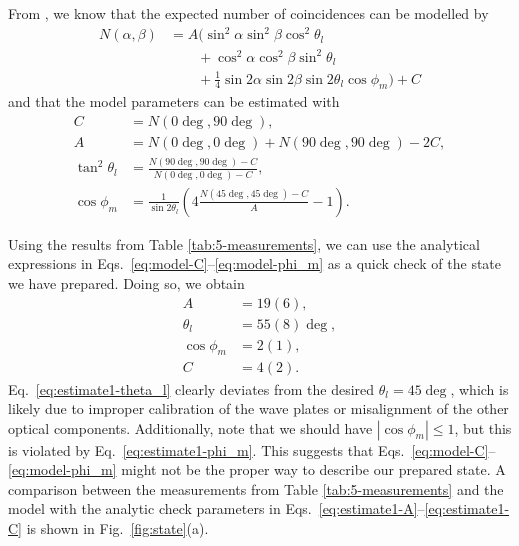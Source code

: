 \documentclass{../paper}
\newcommand{\eq}[1]{Eq.~\eqref{#1}}
\newcommand{\eqs}[2]{Eqs.~\eqref{#1}--\eqref{#2}}
\newcommand{\fig}[1]{Fig.~\ref{#1}}
\begin{document}
From \cite{LabManual}, we know that the expected number of coincidences can be modelled by
\begin{equation}\label{eq:N-model}
  \begin{aligned}
    N(\alpha,\beta)
    &= A (\sin^2\alpha \sin^2\beta \cos^2\theta_l \\
    &\qquad + \cos^2\alpha \cos^2\beta \sin^2\theta_l \\
    &\qquad + \frac{1}{4} \sin2\alpha \sin2\beta \sin2\theta_l \cos\phi_m) + C
  \end{aligned}
\end{equation}
and that the model parameters can be estimated with
\begin{align}
  C &= N(0\deg, 90\deg), \label{eq:model-C} \\
  A &= N(0\deg, 0\deg) + N(90\deg, 90\deg) - 2 C, \label{eq:model-A} \\
  \tan^2\theta_l &= \frac{N(90\deg,90\deg) - C}{N(0\deg,0\deg) - C}, \label{eq:theta_l} \\
  \cos\phi_m &= \frac{1}{\sin 2\theta_l} \left( 4 \frac{N(45\deg, 45\deg) - C}{A} - 1 \right) \label{eq:model-phi_m}.
\end{align}

Using the results from Table \ref{tab:5-measurements}, we can use the analytical expressions in \eqs{eq:model-C}{eq:model-phi_m} as a quick check of the state we have prepared. Doing so, we obtain
\begin{align}
  A &= 19(6), \label{eq:estimate1-A} \\
  \theta_l &= 55(8)\deg, \label{eq:estimate1-theta_l} \\
  \cos\phi_m &= 2(1), \label{eq:estimate1-phi_m} \\
  C &= 4(2). \label{eq:estimate1-C} 
\end{align}
\eq{eq:estimate1-theta_l} clearly deviates from the desired $\theta_l = 45\deg$, which is likely due to improper calibration of the wave plates or misalignment of the other optical components. Additionally, note that we should have $|\cos\phi_m| \leq 1$, but this is violated by \eq{eq:estimate1-phi_m}. This suggests that \eqs{eq:model-C}{eq:model-phi_m} might not be the proper way to describe our prepared state. A comparison between the measurements from Table \ref{tab:5-measurements} and the model with the analytic check parameters in \eqs{eq:estimate1-A}{eq:estimate1-C} is shown in \fig{fig:state}(a).
\end{document}
